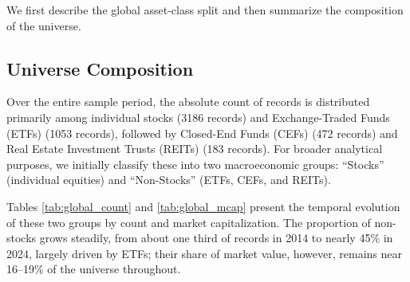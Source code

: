 \documentclass[fleqn]{rbfin}
\begin{document}
We first describe the global asset-class split and then summarize the composition of the universe. 

\subsection{Universe Composition}

\noindent Over the entire sample period, the absolute count of records is distributed primarily among individual stocks (3186 records) and Exchange-Traded Funds (ETFs) (1053 records), followed by Closed-End Funds (CEFs) (472 records) and Real Estate Investment Trusts (REITs) (183 records). For broader analytical purposes, we initially classify these into two macroeconomic groups: ``Stocks'' (individual equities) and ``Non-Stocks'' (ETFs, CEFs, and REITs).

Tables \ref{tab:global_count} and \ref{tab:global_mcap} present the temporal evolution of these two groups by count and market capitalization. The proportion of non-stocks grows steadily, from about one third of records in 2014 to nearly 45\% in 2024, largely driven by ETFs; their share of market value, however, remains near 16--19\% of the universe throughout.
\end{document}
